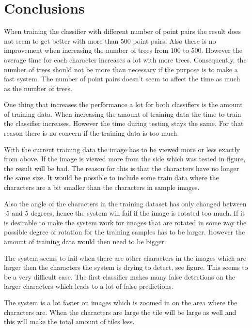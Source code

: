 \section{Conclusions}
\label{sec:Conclusions}
When training the classifier with different number of point pairs the result does not seem to get better with more than 500 point pairs. Also there is no improvement when increasing the number of trees from 100 to 500. However the average time for each character increases a lot with more trees. Consequently, the number of trees should not be more than necessary if the purpose is to make a fast system. The number of point pairs doesn't seem to affect the time as much as the number of trees.
 
One thing that increases the performance a lot for both classifiers is the amount of training data. When increasing the amount of training data the time to train the classifier increases. However the time during testing stays the same. For that reason there is no concern if the training data is too much. 

With the current training data the image has to be viewed more or less exactly from above. If the image is viewed more from the side which was tested in figure, the result will be bad. The reason for this is that the characters have no longer the same size. It would be possible to include some train data where the characters are a bit smaller than the characters in sample images.

Also the angle of the characters in the training dataset has only changed between -5 and 5 degrees, hence the system will fail if the image is rotated too much. If it is desirable to make the system work for images that are rotated in some way the possible degree of rotation for the training samples has to be larger. However the amount of training data would then need to be bigger.

The system seems to fail when there are other characters in the images which are larger then the characters the system is drying to detect, see figure. This seems to be a very difficult case. The first classifier makes many false detections on the larger characters which leads to a lot of false predictions.

The system is a lot faster on images which is zoomed in on the area where the characters are. When the characters are large the tile will be large as well and this will make the total amount of tiles less. 